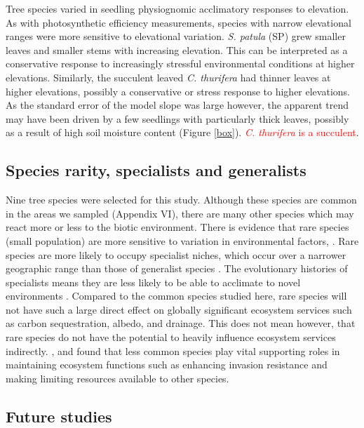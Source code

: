 \documentclass[a4paper, 11pt]{article}
\newcommand{\todo}[1]{\textcolor{red}{#1}}   %
\begin{document}
Tree species varied in seedling physiognomic acclimatory responses to elevation. As with photosynthetic efficiency measurements, species with narrow elevational ranges were more sensitive to elevational variation. \textit{S. patula} (SP) grew smaller leaves and smaller stems with increasing elevation. This can be interpreted as a conservative response to increasingly stressful environmental conditions at higher elevations. Similarly, the succulent leaved \textit{C. thurifera} had thinner leaves at higher elevations, possibly a conservative or stress response to higher elevations. As the standard error of the model slope was large however, the apparent trend may have been driven by a few seedlings with particularly thick leaves, possibly as a result of high soil moisture content (Figure \ref{box}). \todo{\textit{C. thurifera} is a succulent}.

\subsection{Species rarity, specialists and generalists}

Nine tree species were selected for this study. Although these species are common in the areas we sampled (Appendix VI), there are many other species which may react more or less to the biotic environment. There is evidence that rare species (small population) are more sensitive to variation in environmental factors, \citep{Lyons2005,Mouillot2013}. Rare species are more likely to occupy specialist niches, which occur over a narrower geographic range than those of generalist species \citep{Boulangeat2012}. The evolutionary histories of specialists means they are less likely to be able to acclimate to novel environments \citep{}. Compared to the common species studied here, rare species will not have such a large direct effect on globally significant ecosystem services such as carbon sequestration, albedo, and drainage. This does not mean however, that rare species do not have the potential to heavily influence ecosystem services indirectly. \citet{Lyons2001}, and \citet{Lyons2005} found that less common species play vital supporting roles in maintaining ecosystem functions such as enhancing invasion resistance and making limiting resources available to other species.

\subsection{Future studies}
\end{document}
